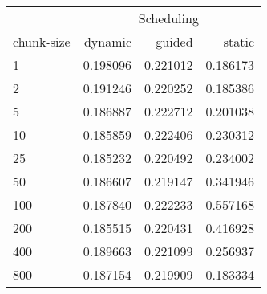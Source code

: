 \begin{tabular}{lrrr}
\toprule
& \multicolumn{3}{c}{Scheduling} \\
chunk-size      &   dynamic &    guided &    static \\
\midrule
 1   &  0.198096 &  0.221012 &  0.186173 \\
 2   &  0.191246 &  0.220252 &  0.185386 \\
 5   &  0.186887 &  0.222712 &  0.201038 \\
 10  &  0.185859 &  0.222406 &  0.230312 \\
 25  &  0.185232 &  0.220492 &  0.234002 \\
 50  &  0.186607 &  0.219147 &  0.341946 \\
 100 &  0.187840 &  0.222233 &  0.557168 \\
 200 &  0.185515 &  0.220431 &  0.416928 \\
 400 &  0.189663 &  0.221099 &  0.256937 \\
 800 &  0.187154 &  0.219909 &  0.183334 \\
\bottomrule
\end{tabular}
